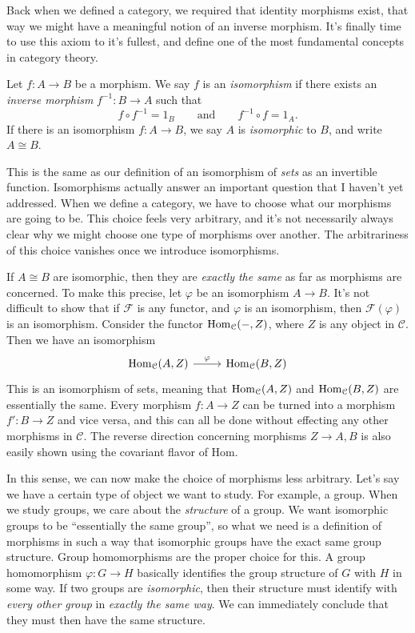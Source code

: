 Back when we defined a category, we required that identity morphisms exist, that way we might have a meaningful notion of an inverse morphism. It's finally time to use this axiom to it's fullest, and define one of the most fundamental concepts in category theory.

\begin{definition}[Isomorphism]\label{dfn:5}
	Let $f : A \to B$ be a morphism. We say $f$ is an \emph{isomorphism} if there exists an \emph{inverse morphism} $f^{-1} : B \to A$ such that
	\[
		f\circ f^{-1} =1_B\qquad \text{and} \qquad f^{-1} \circ f=1_A
	.\]
	If there is an isomorphism $f : A \to B$, we say $A$ is \emph{isomorphic} to $B$, and write $A\cong B$.
\end{definition}

This is the same as our definition of an isomorphism of \emph{sets} as an invertible function. Isomorphisms actually answer an important question that I haven't yet addressed. When we define a category, we have to choose what our morphisms are going to be. This choice feels very arbitrary, and it's not necessarily always clear why we might choose one type of morphisms over another. The arbitrariness of this choice vanishes once we introduce isomorphisms.

If $A\cong B$ are isomorphic, then they are \emph{exactly the same} as far as morphisms are concerned. To make this precise, let $\varphi $ be an isomorphism $A\to B$. It's not difficult to show that if $\mathcal{F} $ is any functor, and $\varphi $ is an isomorphism, then $\mathcal{F} (\varphi )$ is an isomorphism. Consider the functor $\operatorname{Hom}_{\mathcal{C} }(-, Z) $, where $Z$ is any object in $\mathcal{C} $. Then we have an isomorphism
\[\begin{tikzcd}[row sep = 2.5em, column sep = 2.5em]
\Hom_{\mathcal{C} }(A, Z) \ar[" \varphi  ", r]  & \Hom_{\mathcal{C} }(B, Z) 
\end{tikzcd}\]
This is an isomorphism of sets, meaning that $\operatorname{Hom}_{\mathcal{C} }(A, Z) $ and $\operatorname{Hom}_{\mathcal{C} }(B, Z)$ are essentially the same. Every morphism $f : A \to Z$ can be turned into a morphism $f': B \to Z$ and vice versa, and this can all be done without effecting any other morphisms in $\mathcal{C} $. The reverse direction concerning morphisms $Z\to A,B$ is also easily shown using the covariant flavor of Hom.

In this sense, we can now make the choice of morphisms less arbitrary. Let's say we have a certain type of object we want to study. For example, a group. When we study groups, we care about the \emph{structure} of a group. We want isomorphic groups to be ``essentially the same group'', so what we need is a definition of morphisms in such a way that isomorphic groups have the exact same group structure. Group homomorphisms are the proper choice for this. A group homomorphism $\varphi : G \to H$ basically identifies the group structure of $G$ with $H$ in some way. If two groups are \emph{isomorphic}, then their structure must identify with \emph{every other group} in \emph{exactly the same way}. We can immediately conclude that they must then have the same structure.

